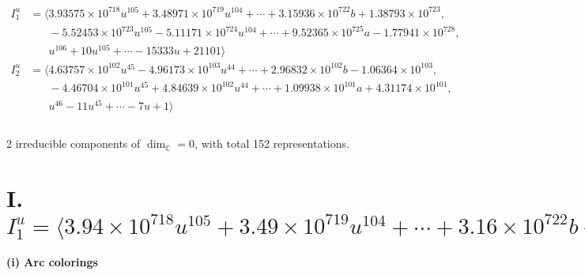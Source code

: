 \documentclass[1p]{elsarticle_modified}
\theoremstyle{definition}
\begin{document}
\begin{align*}
I^u_{1}&=\langle 
3.93575\times10^{718} u^{105}+3.48971\times10^{719} u^{104}+\cdots+3.15936\times10^{722} b+1.38793\times10^{723},\\
\phantom{I^u_{1}}&\phantom{= \langle  }-5.52453\times10^{723} u^{105}-5.11171\times10^{724} u^{104}+\cdots+9.52365\times10^{725} a-1.77941\times10^{728},\\
\phantom{I^u_{1}}&\phantom{= \langle  }u^{106}+10 u^{105}+\cdots-15333 u+21101\rangle \\
I^u_{2}&=\langle 
4.63757\times10^{102} u^{45}-4.96173\times10^{103} u^{44}+\cdots+2.96832\times10^{102} b-1.06364\times10^{103},\\
\phantom{I^u_{2}}&\phantom{= \langle  }-4.46704\times10^{101} u^{45}+4.84639\times10^{102} u^{44}+\cdots+1.09938\times10^{101} a+4.31174\times10^{101},\\
\phantom{I^u_{2}}&\phantom{= \langle  }u^{46}-11 u^{45}+\cdots-7 u+1\rangle \\
\\
\end{align*}
\raggedright * 2 irreducible components of $\dim_{\mathbb{C}}=0$, with total 152 representations.\\
\newpage
\renewcommand{\arraystretch}{1}
\centering \section*{I. $I^u_{1}= \langle 3.94\times10^{718} u^{105}+3.49\times10^{719} u^{104}+\cdots+3.16\times10^{722} b+1.39\times10^{723},\;-5.52\times10^{723} u^{105}-5.11\times10^{724} u^{104}+\cdots+9.52\times10^{725} a-1.78\times10^{728},\;u^{106}+10 u^{105}+\cdots-15333 u+21101 \rangle$}
\flushleft \textbf{(i) Arc colorings}\\
\end{document}
